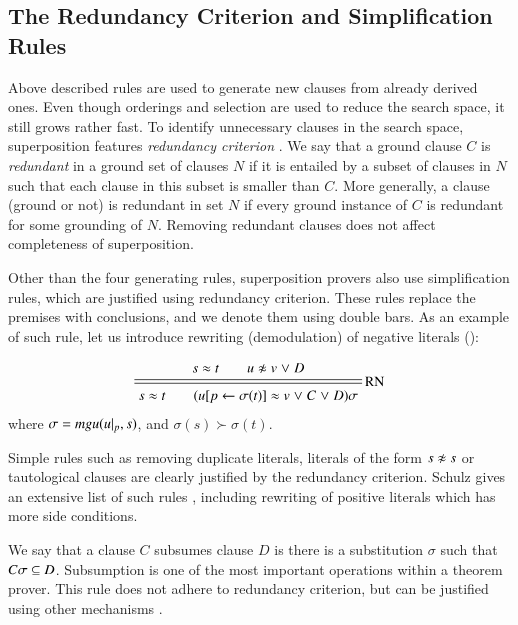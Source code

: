 \medskip

\subsection{The Redundancy Criterion and Simplification Rules}

Above described rules are used to generate new clauses from already derived
ones. Even though orderings and selection are used to reduce the search space,
it still grows rather fast. To identify unnecessary clauses in the search
space, superposition features \emph{redundancy criterion}
\cite[Sect.~4.2.2]{bg-01-resolution}. We say that a ground clause $C$ is
{\em redundant} in a ground set of clauses $N$ if it is entailed by a subset of
clauses in $N$ such that each clause in this subset is smaller than $C$. More
generally, a clause (ground or not) is redundant in set $N$ if every ground
instance of $C$ is redundant for some grounding of $N$. Removing redundant
clauses does not affect completeness of superposition.

Other than the four generating rules, superposition provers also use
simplification rules, which are justified using redundancy criterion. These
rules replace the premises with conclusions, and we denote them using double
bars. As an example of such rule, let us introduce rewriting (demodulation) of
negative literals ():

\[
\namedsimp{RN}{s \eq t \qquad u \noteq v \llor D}
              {s \eq t \qquad (u[p \leftarrow \sigma(t)] \eq v \llor C \llor D)\sigma}
\]
where $\sigma = \mathit{mgu}(u|_p, s)$, and $\sigma(s) \succ \sigma(t)$.


Simple rules such as removing duplicate literals, literals of the form $s \noteq
s$ or tautological clauses are clearly justified by the redundancy criterion.
Schulz gives an extensive list of such rules \cite{ss-02-brainiac}, including rewriting of positive
literals which has more side conditions.

We say that a clause $C$ subsumes clause $D$ is there is a substitution $\sigma$
such that $C\sigma \subseteq D$. Subsumption is one of the most important
operations within a theorem prover. This rule does not adhere to redundancy
criterion, but can be justified using other mechanisms \cite{wtrb-20-sat-framework}.

